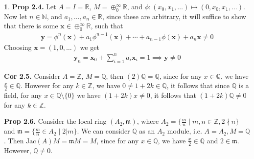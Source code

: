\documentclass[11pt]{article}
\theoremstyle{definition}
\newtheorem{pb}{}
\newcommand{\set}[1]{\{#1\}}
\newcommand{\jac}{\text{Jac}}
\begin{document}
    \begin{pb}
        \textbf{Prop 2.4.} Let \(A = I = \mathbb{R}\), \(M = \oplus_{0}^\infty \mathbb{R}\), and \(\phi: (x_0,x_1,\hdots) \mapsto (0,x_0,x_1, \hdots)\). Now let \(n \in \mathbb{N}\), and \(a_1, \hdots, a_n \in \mathbb{R}\), since these are arbitrary, it will suffice to show that there is some \(\mathbf{x} \in \oplus_{0}^\infty \mathbb{R}\), such that
        \begin{align*}
            \mathbf{y} = \phi^n(\mathbf{x}) + a_1\phi^{n-1}(\mathbf{x}) + \cdots + a_{n-1}\phi(\mathbf{x}) + a_n\mathbf{x} \neq 0
        \end{align*}
        Choosing \(\mathbf{x} = (1,0,\hdots)\) we get
        \begin{align*}
            \mathbf{y}_n = \mathbf{x}_0 + \sum_{i=1}^n a_i\mathbf{x}_i = 1 \implies \mathbf{y} \neq 0
        \end{align*}

        \textbf{Cor 2.5.} Consider \(A = \mathbb{Z}\), \(M = \mathbb{Q}\), then \((2)\mathbb{Q} = \mathbb{Q}\), since for any \(x \in \mathbb{Q}\), we have \(\frac{x}{2} \in \mathbb{Q}\). However for any \(k \in \mathbb{Z}\), we have \(0 \neq 1 + 2k \in \mathbb{Q}\), it follows that since \(\mathbb{Q}\) is a field, for any \(x \in \mathbb{Q} \setminus \set{0}\) we have \((1+2k)x \neq 0\), it follows that \((1 + 2k)\mathbb{Q} \neq 0\) for any \(k \in \mathbb{Z}\).

        \textbf{Prop 2.6.} Consider the local ring \((A_2,\mathfrak{m})\), where \(A_2 = \set{\frac{m}{n} \mid m,n \in \mathbb{Z}, 2 \nmid n}\) and \(\mathfrak{m} = \set{\frac{m}{n} \in A_2 \mid 2 \vert m}\). We can consider \(\mathbb{Q}\) as an \(A_2\) module, i.e. \(A = A_2, M = \mathbb{Q}\). 
        Then \(\jac(A)M = \mathfrak{m}M = M\), since for any \(x \in \mathbb{Q}\), we have \(\frac{x}{2} \in \mathbb{Q}\) and \(2 \in \mathfrak{m}\). However, \(\mathbb{Q} \neq 0\).
    \end{pb}
\end{document}
